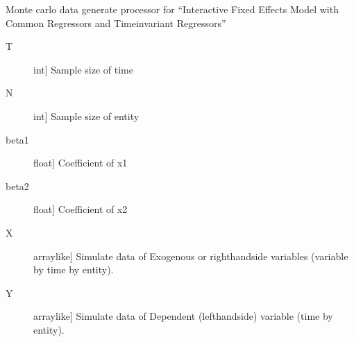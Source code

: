 \documentclass[a4paper,11pt,english]{sphinxmanual}
\begin{document}
\begin{fulllineitems}
\label{\detokenize{analysis:src.analysis.monte_carlo_dgp.dgp_additive_fixed_effects_model_no_iid}}
\sphinxAtStartPar
Monte carlo data generate processor for “Interactive Fixed Effects Model with Common
Regressors and Time\sphinxhyphen{}invariant Regressors”
\begin{description}
\item[{T}] \leavevmode{[}int{]}
\sphinxAtStartPar
Sample size of time

\item[{N}] \leavevmode{[}int{]}
\sphinxAtStartPar
Sample size of entity

\item[{beta1}] \leavevmode{[}float{]}
\sphinxAtStartPar
Coefficient of x1

\item[{beta2}] \leavevmode{[}float{]}
\sphinxAtStartPar
Coefficient of x2

\end{description}
\begin{description}
\item[{X}] \leavevmode{[}array\sphinxhyphen{}like{]}
\sphinxAtStartPar
Simulate data of Exogenous or right\sphinxhyphen{}hand\sphinxhyphen{}side variables (variable by time by
entity).

\item[{Y}] \leavevmode{[}array\sphinxhyphen{}like{]}
\sphinxAtStartPar
Simulate data of Dependent (left\sphinxhyphen{}hand\sphinxhyphen{}side) variable (time by entity).


\end{description}
\end{fulllineitems}
\end{document}
